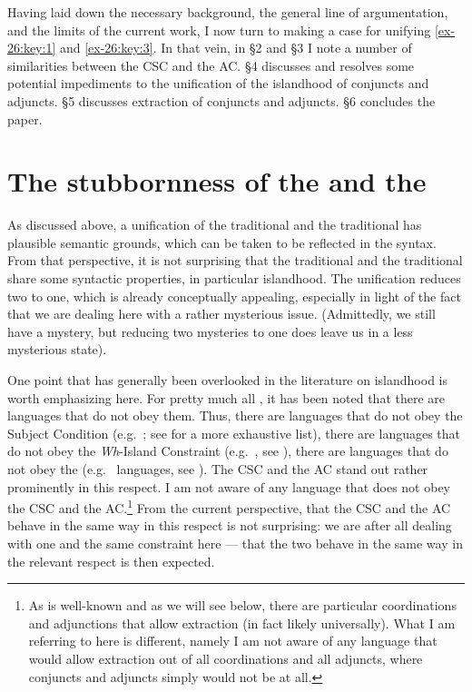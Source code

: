 \documentclass[output=paper]{langsci/langscibook}
\begin{document}
Having laid down the necessary background, the general line of argumentation,
and the limits of the current work, I now turn to making a case for unifying
\eqref{ex-26:key:1} and \eqref{ex-26:key:3}. In that vein, in §2 and §3 I note a number of similarities between
the \gls{CSC} and the \glsdesc{AC}. §4 discusses and resolves some potential
impediments to the unification of the islandhood of conjuncts and adjuncts. §5
discusses extraction of conjuncts and adjuncts. §6 concludes the paper.

\section{The stubbornness of the  and the }

As discussed above, a unification of the traditional  and the
traditional  has plausible semantic grounds, which can be taken to be
reflected in the syntax. From that perspective, it is not surprising that the
traditional  and the traditional  share some syntactic
properties, in particular islandhood. The unification reduces two  to
one, which is already conceptually appealing, especially in light of the fact
that we are dealing here with a rather mysterious issue. (Admittedly, we still
have a mystery, but reducing two mysteries to one does leave us in a less
mysterious state).

One point that has generally been overlooked in the literature on islandhood is
worth emphasizing here. For pretty much all , it has been noted that
there are languages that do not obey them. Thus, there are languages that do
not obey the Subject Condition (e.g.\ ; see \citealt{Stepanov2001b} for
a more exhaustive list), there are languages that do not obey the
\emph{Wh}-Island Constraint (e.g.\ , see \citealt{Engdahl1986}), there
are languages that do not obey the  (e.g.\ 
languages, see \citealt{Boskovic2015}). The \gls{CSC} and the \gls{AC} stand
out rather prominently in this respect. I am not aware of any language that
does not obey the \gls{CSC} and the \gls{AC}.\footnote{As is well-known and as
    we will see below, there are particular coordinations and adjunctions that
    allow extraction (in fact likely universally). What I am referring to here
    is different, namely I am not aware of any language that would allow
extraction out of all coordinations and all adjuncts, where conjuncts and
adjuncts simply would not be  at all.} From the current perspective,
that the \gls{CSC} and the \gls{AC} behave in the same way in this respect is
not surprising: we are after all dealing with one and the same constraint here
--- that the two behave in the same way in the relevant respect is then
expected.
\end{document}
